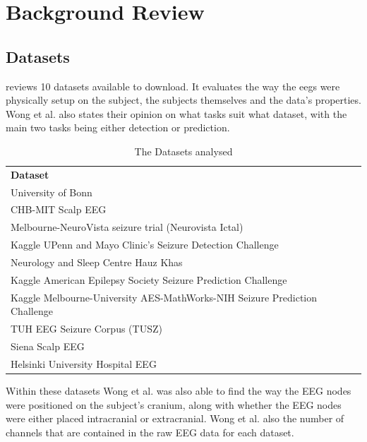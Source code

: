 \documentclass[12pt]{article}
\begin{document}
\section{Background Review}

\subsection{Datasets}\label{datasets}

\cite{wong2023eeg} reviews 10 datasets available to download. It evaluates the way the \acrshort{eegs} were physically setup on the subject, the subjects themselves and the data's properties. Wong et al. also states their opinion on what tasks suit what dataset, with the main two tasks being either detection or prediction. 

\begin{table}[H]
\centering
\begin{tabular}{l}
\textbf{Dataset}                       \\
University of Bonn                   \\
CHB-MIT Scalp EEG                    \\
Melbourne-NeuroVista seizure trial (Neurovista Ictal)                           \\
Kaggle UPenn and Mayo Clinic's Seizure Detection Challenge                     \\
Neurology and Sleep Centre Hauz Khas \\
Kaggle American Epilepsy Society Seizure Prediction Challenge                  \\
Kaggle Melbourne-University AES-MathWorks-NIH Seizure Prediction Challenge \\
TUH EEG Seizure Corpus (TUSZ)        \\
Siena Scalp EEG                      \\
Helsinki University Hospital EEG    
\end{tabular}
\caption{The Datasets analysed}
\end{table}

Within these datasets Wong et al. was also able to find the way the EEG nodes were positioned on the subject's cranium, along with whether the EEG nodes were either placed intracranial or extracranial. Wong et al. also the number of channels that are contained in the raw EEG data for each dataset.
\end{document}
